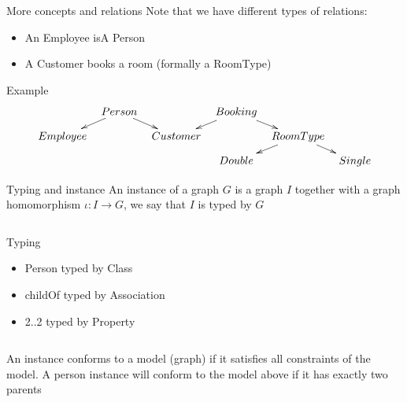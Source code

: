 \documentclass[slidetop,mathserif,red]{beamer}
\begin{document}
\begin{frame}{More concepts and relations}
Note that we have different types of relations:
\begin{itemize}
\item An Employee isA Person
\item A Customer books a room (formally a RoomType)
\end{itemize}

    {Example}
     \[\xymatrixrowsep{0.1in}
		\xymatrixcolsep{0.1in}
      \xymatrix{		& Person \ar[dl] \ar[dr]		&& Booking \ar[dl]\ar[dr]\\
      					Employee		&& Customer	& 						&RoomType \ar[dl] \ar[dr]\\
      																&&& Double			&& Single} \]
    
\end{frame}





\begin{frame}{Typing and instance}
An instance of a graph $G$ is a graph $I$ together with a graph homomorphism $\iota:I \to G$, we say that $I$ is typed by $G$

    \begin{columns}[T]
    \begin{block}{Typing}
        \begin{itemize}
        \item Person typed by Class
        \item childOf typed by Association
        \item 2..2 typed by Property
        \end{itemize}
    \end{block}
   

  \end{columns}
\vspace{-3em}
An instance conforms to a model (graph) if it satisfies all constraints of the model.
A person instance will conform to the model above if it has exactly two parents

\end{frame}










\end{document}
